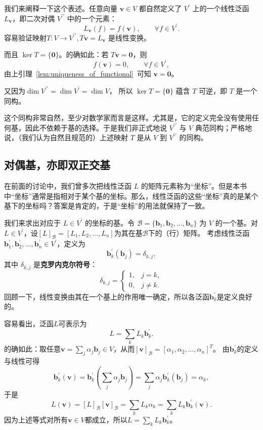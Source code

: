 我们来阐释一下这个表述。任意向量 $\mathbf{v}\in V$ 都自然定义了 $V^\prime$ 上的一个线性泛函 $L_{\mathbf{v}}$，即二次对偶 $V^{\prime\prime}$ 中的一个元素：
\[
    L_{\mathbf{v}}(f)=f(\mathbf{v}),\qquad \forall f\in V^\prime.
\]
容易验证映射$T:V\to V^{\prime\prime}, T\mathbf{v}=L_{\mathbf{v}}$
是线性变换。

而且 $\ker T=\{\mathbf{0}\}$。的确如此：若 $T\mathbf{v}=\mathbf{0}$，则
\[
    f(\mathbf{v})=0,\qquad \forall f\in V^\prime,
\]
由上引理~\ref{lem:uniqueness_of_functional}~可知 $\mathbf{v}=\mathbf{0}$。

又因为$\dim V^{\prime\prime}=\dim V^\prime=\dim V$，
所以 $\ker T=\{\mathbf{0}\}$ 蕴含 $T$ 可逆，即 $T$ 是一个同构。

这个同构非常自然，至少对数学家而言是这样。尤其是，它的定义完全没有使用任何基，因此不依赖于基的选择。于是我们非正式地说 $V^{\prime\prime}$ 与 $V$ 典范同构；严格地说，（我们认为自然且规范的）上述映射 $T$ 是从 $V$ 到 $V^{\prime\prime}$ 的同构。

\subsection{对偶基，亦即双正交基}\label{sec:dual_basis}

在前面的讨论中，我们曾多次把线性泛函 $L$ 的矩阵元素称为“坐标”。但是本书中“坐标”通常是指相对于某个基的坐标。那么，线性泛函的这些“坐标”真的是某个基下的坐标吗？答案是肯定的，于是“坐标”的用法就保持了一致。

我们来求出对应于 $L \in V^\prime$ 的坐标的基。令 $\mathcal{B}=\{\mathbf{b}_1,\mathbf{b}_2,\ldots,\mathbf{b}_n\}$ 为 $V$ 的一个基。对 $L\in V^\prime$，设$[L]_{\mathcal{B}}=[L_1,L_2,\ldots,L_n]$为其在基$\mathcal{B}$下的（行）矩阵。
考虑线性泛函 $\mathbf{b}_1^\prime,\mathbf{b}_2^\prime,\ldots,\mathbf{b}_n^\prime\in V^\prime$，定义为
\begin{equation}\label{eq:dual_basis_definition}
    \mathbf{b}_k^\prime(\mathbf{b}_j)=\delta_{k,j},
\end{equation}
其中 $\delta_{k,j}$ 是{\bf 克罗内克尔符号}：
\[
    \delta_{k,j}=
    \begin{cases}
        1,&j=k,\\
        0,&j\ne k.
    \end{cases}
\]
回顾一下，线性变换由其在一个基上的作用唯一确定，所以各泛函$\mathbf{b}_k^\prime$是定义良好的。

容易看出，泛函$L$可表示为
\[
    L=\sum_k L_k\mathbf{b}_k^\prime.
\]
的确如此：取任意$\mathbf{v}=\sum_j\alpha_j\mathbf{b}_j\in V$，从而$[\mathbf{v}]_\mathcal{B}=[\alpha_1,\alpha_2,\dots,\alpha_n]^T$。
由$\mathbf{b}_k^\prime$的定义与线性可得
\[
    \mathbf{b}_k^\prime(\mathbf{v})
    =\mathbf{b}_k^\prime\left(\sum_j\alpha_j\mathbf{b}_j\right)
    =\sum_j\alpha_j\mathbf{b}_k^\prime(\mathbf{b}_j)
    =\alpha_k,
\]
于是
\[
    L(\mathbf{v})
    =[L]_{\mathcal{B}}[\mathbf{v}]_{\mathcal{B}}
    =\sum_kL_k\alpha_k
    =\sum_kL_k\mathbf{b}_k^\prime(\mathbf{v}).
\]
因为上述等式对所有$\mathbf{v}\in V$都成立，所以$L=\sum_k L_k\mathbf{b}_k^\prime$。

